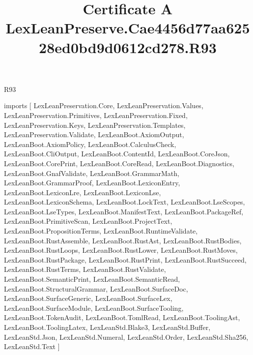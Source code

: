 \begin{lexlean}{R93}
\title{Certificate A LexLeanPreserve.Cae4456d77aa62528ed0bd9d0612cd278.R93}
\begin{coremodule}
imports [
  LexLeanPreservation.Core,
  LexLeanPreservation.Values,
  LexLeanPreservation.Primitives,
  LexLeanPreservation.Fixed,
  LexLeanPreservation.Keys,
  LexLeanPreservation.Templates,
  LexLeanPreservation.Validate,
  LexLeanBoot.AxiomOutput,
  LexLeanBoot.AxiomPolicy,
  LexLeanBoot.CalculusCheck,
  LexLeanBoot.CliOutput,
  LexLeanBoot.ContentId,
  LexLeanBoot.CoreJson,
  LexLeanBoot.CorePrint,
  LexLeanBoot.CoreRead,
  LexLeanBoot.Diagnostics,
  LexLeanBoot.GnafValidate,
  LexLeanBoot.GrammarMath,
  LexLeanBoot.GrammarProof,
  LexLeanBoot.LexiconEntry,
  LexLeanBoot.LexiconLre,
  LexLeanBoot.LexiconLse,
  LexLeanBoot.LexiconSchema,
  LexLeanBoot.LockText,
  LexLeanBoot.LseScopes,
  LexLeanBoot.LseTypes,
  LexLeanBoot.ManifestText,
  LexLeanBoot.PackageRef,
  LexLeanBoot.PrimitiveScan,
  LexLeanBoot.ProjectText,
  LexLeanBoot.PropositionTerms,
  LexLeanBoot.RuntimeValidate,
  LexLeanBoot.RustAssemble,
  LexLeanBoot.RustAst,
  LexLeanBoot.RustBodies,
  LexLeanBoot.RustLoops,
  LexLeanBoot.RustLower,
  LexLeanBoot.RustMoves,
  LexLeanBoot.RustPackage,
  LexLeanBoot.RustPrint,
  LexLeanBoot.RustSucceed,
  LexLeanBoot.RustTerms,
  LexLeanBoot.RustValidate,
  LexLeanBoot.SemanticPrint,
  LexLeanBoot.SemanticRead,
  LexLeanBoot.StructuralGrammar,
  LexLeanBoot.SurfaceDoc,
  LexLeanBoot.SurfaceGeneric,
  LexLeanBoot.SurfaceLex,
  LexLeanBoot.SurfaceModule,
  LexLeanBoot.SurfaceTooling,
  LexLeanBoot.TokenAudit,
  LexLeanBoot.TomlRead,
  LexLeanBoot.ToolingAst,
  LexLeanBoot.ToolingLatex,
  LexLeanStd.Blake3,
  LexLeanStd.Buffer,
  LexLeanStd.Json,
  LexLeanStd.Numeral,
  LexLeanStd.Order,
  LexLeanStd.Sha256,
  LexLeanStd.Text
]


\end{coremodule}
\end{lexlean}

